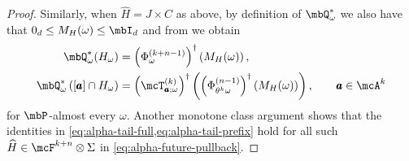 \documentclass[a4paper]{article}
\numberwithin{equation}{section}   %
\theoremstyle{plain}   %
\theoremstyle{plain}   %
\theoremstyle{examplestyle}
\DeclareMathOperator{\pr}{\mbP}           %
\newcommand{\adj}{^\dagger}         %
\begin{document}
\begin{proof}
            Similarly, when $\widehat H = J \times C$ as above, by definition of $\mbQ^*_\omega$ we also have that \(0_d\le M_H(\omega)\le\mbI_d\) and from  we obtain 
            \begin{align}
                \mbQ^*_\omega(H_\omega)
                &=
                \left(\Phi_\omega^{(k+n-1)}\right)\adj
                \left(M_H(\omega)\right),
                \label{eq:alpha-tail-full}\\
                \mbQ^*_\omega
                \left([\pmb a]\cap H_\omega\right)
                &=
                \left(\mcT_{\pmb a;\omega}^{(k)}\right)\adj
                \left(
                    \left(
                        \Phi_{\theta^k\omega}^{(n-1)}
                    \right)\adj
                    \left(M_H(\omega)\right)
                \right),
                \qquad
                \pmb a\in\mcA^k
                \label{eq:alpha-tail-prefix}
            \end{align}
            for \(\pr\)-almost every \(\omega\). 
            Another monotone class argument shows that the identities in \cref{eq:alpha-tail-full,eq:alpha-tail-prefix} hold for all such $\widehat H \in \mcF^{k+n}\otimes \Sigma$ in \eqref{eq:alpha-future-pullback}.
        
            \medskip
        

\end{proof}
\end{document}
